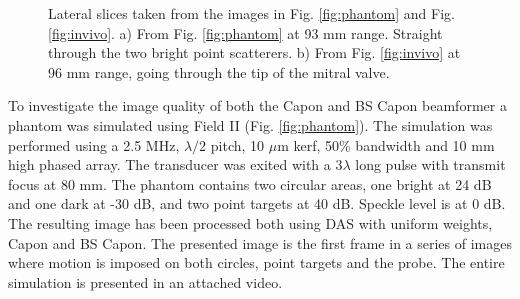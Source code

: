 \documentclass[12pt,journal,onecolumn]{IEEEtran}
\begin{document}
\begin{figure}[!t]
\centerline{
\hfil
{}
}
\caption{Lateral slices taken from the images in Fig. \ref{fig:phantom} and Fig. \ref{fig:invivo}. a) From Fig. \ref{fig:phantom} at 93 mm range. Straight through the two bright point scatterers. b) From Fig. \ref{fig:invivo} at 96 mm range, going through the tip of the mitral valve.}
\label{fig:slices}
\end{figure}

To investigate the image quality of both the Capon and BS Capon beamformer a phantom was simulated using Field II \cite{Jensen1992} (Fig. \ref{fig:phantom}). The simulation was performed using a 2.5 MHz, $\lambda/2$ pitch, 10 $\mu$m kerf, 50\% bandwidth and 10 mm high phased array. The transducer was exited with a $3\lambda$ long pulse with transmit focus at 80 mm. The phantom contains two circular areas, one bright at 24 dB and one dark at -30 dB, and two point targets at 40 dB. Speckle level is at 0 dB. The resulting image has been processed both using DAS with uniform weights, Capon and BS Capon. The presented image is the first frame in a series of images where motion is imposed on both circles, point targets and the probe. The entire simulation is presented in an attached video.
\end{document}
